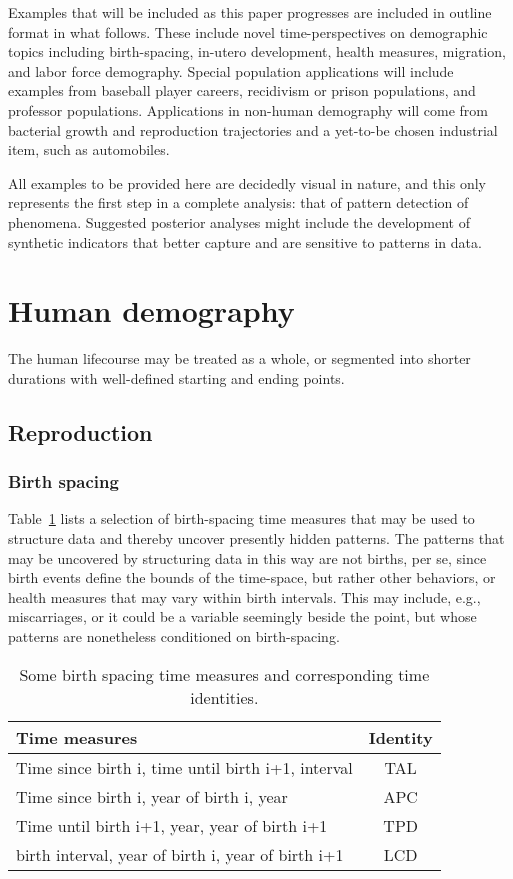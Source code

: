 \documentclass[11pt,oneside]{article} %
\begin{document}
Examples that will be included as this paper progresses are included in
outline format in what follows. These include novel time-perspectives on
demographic topics including birth-spacing, in-utero development, health
measures, migration, and labor force demography. Special population applications
will include examples from baseball player careers, recidivism or prison
populations, and professor populations. Applications in non-human demography
will come from bacterial growth and reproduction trajectories and a yet-to-be
chosen industrial item, such as automobiles.

All examples to be provided here are decidedly visual in nature, and this only
represents the first step in a complete analysis: that of pattern detection of
phenomena. Suggested posterior analyses might include the development of
synthetic indicators that better capture and are sensitive to patterns in data.

\section{Human demography}
The human lifecourse may be treated as a whole, or segmented into shorter
durations with well-defined starting and ending points. 

	\subsection{Reproduction}
	
		\subsubsection{Birth spacing}
		\FloatBarrier
		Table~\ref{tab:spacing} lists a selection of birth-spacing time measures that
		may be used to structure data and thereby uncover presently hidden patterns.
		The patterns that may be uncovered by structuring data in this way are not
		births, per se, since birth events define the bounds of the time-space, but
		rather other behaviors, or health measures that may vary within birth
		intervals. This may include, e.g., miscarriages, or it could be a variable
		seemingly beside the point, but whose patterns are nonetheless conditioned on
		birth-spacing.
		
		\begin{table}[h!]
		\caption{Some birth spacing time measures and corresponding time identities.}
	    \label{tab:spacing}
		\begin{tabular}{lc}
		Time measures & Identity \\ \hline
		Time since birth i, time until birth i+1, interval & TAL\\
		Time since birth i, year of birth i, year & APC\\
		Time until birth i+1, year, year of birth i+1 & TPD\\
		birth interval, year of birth i, year of birth i+1 & LCD
		\end{tabular}
		\end{table}
		
\end{document}
